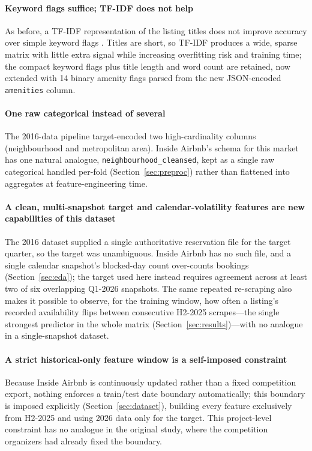 \documentclass[journal]{IEEEtran}
\begin{document}
\paragraph{Keyword flags suffice; TF-IDF does not help} As before, a TF-IDF
representation of the listing titles does not improve accuracy over simple
keyword flags \cite{islam2022}. Titles are short, so TF-IDF produces a wide,
sparse matrix with little extra signal while increasing overfitting risk and
training time; the compact keyword flags plus title length and word count are
retained, now extended with 14 binary amenity flags parsed from the new
JSON-encoded \texttt{amenities} column.

\paragraph{One raw categorical instead of several} The 2016-data pipeline
target-encoded two high-cardinality columns (neighbourhood and metropolitan
area). Inside Airbnb's schema for this market has one natural analogue,
\texttt{neighbourhood\_cleansed}, kept as a single raw categorical handled
per-fold (Section~\ref{sec:preproc}) rather than flattened into aggregates at
feature-engineering time.

\paragraph{A clean, multi-snapshot target and calendar-volatility features are
new capabilities of this dataset} The 2016 dataset supplied a single
authoritative reservation file for the target quarter, so the target was
unambiguous. Inside Airbnb has no such file, and a single calendar snapshot's
blocked-day count over-counts bookings (Section~\ref{sec:eda}); the target
used here instead requires agreement across at least two of six overlapping
Q1-2026 snapshots. The same repeated re-scraping also makes it possible to
observe, for the training window, how often a listing's recorded availability
flips between consecutive H2-2025 scrapes---the single strongest predictor in
the whole matrix (Section~\ref{sec:results})---with no analogue in a
single-snapshot dataset.

\paragraph{A strict historical-only feature window is a self-imposed
constraint} Because Inside Airbnb is continuously updated rather than a fixed
competition export, nothing enforces a train/test date boundary automatically;
this boundary is imposed explicitly (Section~\ref{sec:dataset}), building every
feature exclusively from H2-2025 and using 2026 data only for the target. This
project-level constraint has no analogue in the original study, where the
competition organizers had already fixed the boundary.
\end{document}
